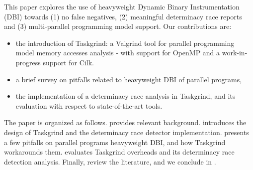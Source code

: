 This paper explores the use of heavyweight Dynamic Binary Instrumentation (DBI) towards (1) no false negatives, (2) meaningful determinacy race reports and (3) multi-parallel programming model support.
Our contributions are:
\begin{itemize}
	\item	the introduction of Taskgrind: a Valgrind tool for parallel programming model memory accesses analysis - with support for OpenMP and a work-in-progress support for Cilk.
	\item 	a brief survey on pitfalls related to heavyweight DBI of parallel programs,
	\item 	the implementation of a determinacy race analysis in Taskgrind, and its evaluation with respect to state-of-the-art tools.
\end{itemize}

The paper is organized as follows.
 provides relevant background.
 introduces the design of Taskgrind and the determinacy race detector implementation.
 presents a few pitfalls on parallel programs heavyweight DBI, and how Taskgrind workarounds them.
 evaluates Taskgrind overheads and its determinacy race detection analysis.
Finally,  review the literature, and we conclude in .
